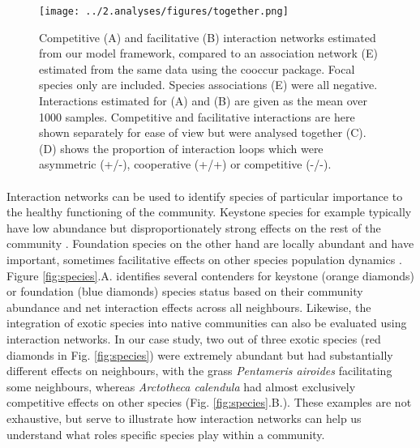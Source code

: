 \documentclass[a4,12pt]{article}
\begin{document}
    \begin{figure}[H]
        \hspace*{-2cm}
        \texttt{[image: ../2.analyses/figures/together.png]}
        \caption{Competitive (A) and facilitative (B) interaction networks estimated from our model framework, compared to an association network (E) estimated from the same data using the cooccur package. Focal species only are included. Species associations (E) were all negative.  Interactions estimated for (A) and (B) are given as the mean over 1000 samples. Competitive and facilitative interactions are here shown separately for ease of view but were analysed together (C). (D) shows the proportion of interaction loops which were asymmetric (+/-), cooperative (+/+) or competitive (-/-).}
        \label{fig:netwks}
    \end{figure}    

    \paragraph{} 
    Interaction networks can be used to identify species of particular importance to the healthy functioning of the community. Keystone species for example typically have low abundance but disproportionately strong effects on the rest of the community \citep{Power1996}. Foundation species on the other hand are locally abundant and have important, sometimes facilitative effects on other species population dynamics \citep{Ellison2019}. Figure \ref{fig:species}.A. identifies several contenders for keystone (orange diamonds) or foundation (blue diamonds) species status based on their community abundance and net interaction effects across all neighbours. Likewise, the integration of exotic species into native communities can also be evaluated using interaction networks. In our case study, two out of three exotic species (red diamonds in Fig. \ref{fig:species}) were extremely abundant but had substantially different effects on neighbours, with the grass \textit{Pentameris airoides} facilitating some neighbours, whereas \textit{Arctotheca calendula} had almost exclusively competitive effects on other species (Fig. \ref{fig:species}.B.). These examples are not exhaustive, but serve to illustrate how interaction networks can help us understand what roles specific species play within a community.


\end{document}
